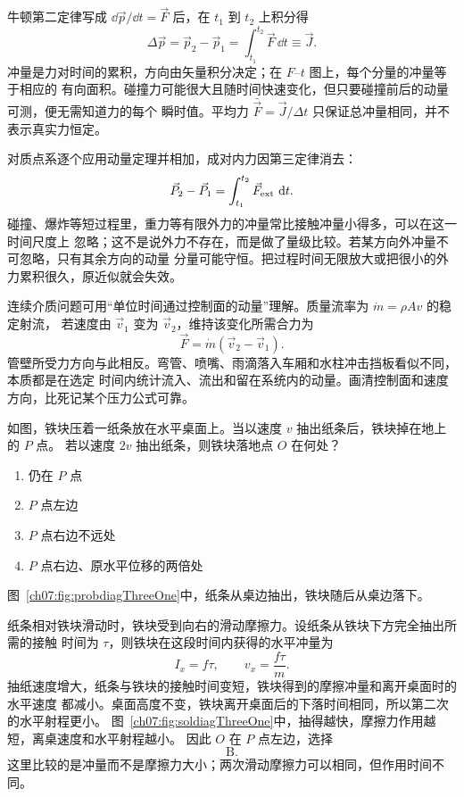 {牛顿第二定律写成 $\dd\vec p/\dd t=\vec F$ 后，在 $t_1$ 到 $t_2$ 上积分得
\begin{equation}
 \Delta\vec p=\vec p_2-\vec p_1
 =\int_{t_1}^{t_2}\vec F\,\dd t\equiv\vec J.
\end{equation}
冲量是力对时间的累积，方向由矢量积分决定；在 $F$--$t$ 图上，每个分量的冲量等于相应的
有向面积。碰撞力可能很大且随时间快速变化，但只要碰撞前后的动量可测，便无需知道力的每个
瞬时值。平均力 $\bar{\vec F}=\vec J/\Delta t$ 只保证总冲量相同，并不表示真实力恒定。

对质点系逐个应用动量定理并相加，成对内力因第三定律消去：
\begin{equation}
 \vec P_2-\vec P_1=\int_{t_1}^{t_2}\vec F_{\rm ext}\,\mathop{}\!\mathrm d t.
\end{equation}
碰撞、爆炸等短过程里，重力等有限外力的冲量常比接触冲量小得多，可以在这一时间尺度上
忽略；这不是说外力不存在，而是做了量级比较。若某方向外冲量不可忽略，只有其余方向的动量
分量可能守恒。把过程时间无限放大或把很小的外力累积很久，原近似就会失效。

连续介质问题可用“单位时间通过控制面的动量”理解。质量流率为 $\dot m=\rho Av$ 的稳定射流，
若速度由 $\vec v_1$ 变为 $\vec v_2$，维持该变化所需合力为
\begin{equation}
 \vec F=\dot m(\vec v_2-\vec v_1).
\end{equation}
管壁所受力方向与此相反。弯管、喷嘴、雨滴落入车厢和水柱冲击挡板看似不同，本质都是在选定
时间内统计流入、流出和留在系统内的动量。画清控制面和速度方向，比死记某个压力公式可靠。


\begin{origexamplebox}{}\label{ch07:ex:s07-3-1}
如图，铁块压着一纸条放在水平桌面上。当以速度 $v$ 抽出纸条后，铁块掉在地上的 $P$ 点。
若以速度 $2v$ 抽出纸条，则铁块落地点 $O$ 在何处？
\begin{enumerate}[label=\Alph*.,leftmargin=2.2em]
 \item 仍在 $P$ 点
 \item $P$ 点左边
 \item $P$ 点右边不远处
 \item $P$ 点右边、原水平位移的两倍处
\end{enumerate}
图~\ref{ch07:fig:probdiagThreeOne}中，纸条从桌边抽出，铁块随后从桌边落下。
\probdiagThreeOne
\end{origexamplebox}

\begin{xesolution}
纸条相对铁块滑动时，铁块受到向右的滑动摩擦力。设纸条从铁块下方完全抽出所需的接触
时间为 $\tau$，则铁块在这段时间内获得的水平冲量为
\[
 I_x=f\tau,
 \qquad
 v_x=\frac{f\tau}{m}.
\]
抽纸速度增大，纸条与铁块的接触时间变短，铁块得到的摩擦冲量和离开桌面时的水平速度
都减小。桌面高度不变，铁块离开桌面后的下落时间相同，所以第二次的水平射程更小。
图~\ref{ch07:fig:soldiagThreeOne}中，抽得越快，摩擦力作用越短，离桌速度和水平射程越小。
\soldiagThreeOne
因此 $O$ 在 $P$ 点左边，选择
\[
 \boxed{\text{B}}.
\]
这里比较的是冲量而不是摩擦力大小；两次滑动摩擦力可以相同，但作用时间不同。
\end{xesolution}

}
